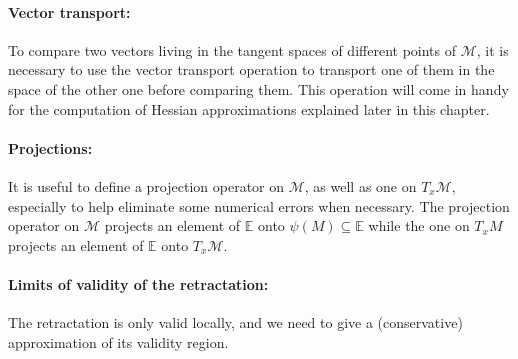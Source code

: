 \paragraph{Vector transport:}
To compare two vectors living in the tangent spaces of different points of $\mathcal{M}$, it is necessary to use the vector transport operation to transport one of them in the space of the other one before comparing them.
This operation will come in handy for the computation of Hessian approximations explained later in this chapter.


\paragraph{Projections:} It is useful to define a projection operator on $\mathcal{M}$, as well as one on $T_x\mathcal{M}$, especially to help eliminate some numerical errors when necessary.
The projection operator on $\mathcal{M}$ projects an element of $\mathbb{E}$ onto $\psi(M)\subseteq \mathbb{E}$ while the one on $T_x{M}$ projects an element of $\mathbb{E}$ onto $T_x\mathcal{M}$.

\paragraph{Limits of validity of the retractation:} The retractation is only valid locally, and we need to give a (conservative) approximation of its validity region.


